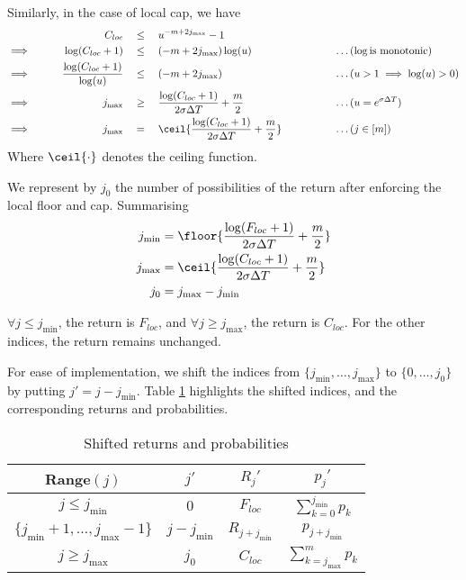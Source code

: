 Similarly, in the case of local cap, we have
\begin{alignat*}{9}
	                 &&  C_{loc}  \quad & \le \quad  u^{ -m + 2 j_{\max} } - 1 && \\
	\implies \qquad  &&  \log(C_{loc} + 1)  \quad & \le \quad  ( -m + 2 j_{\max} ) \log(u)  &&  \qquad \qquad \dots (\log \text{is monotonic}) \\
	\implies \qquad  &&  \frac{\log(C_{loc} + 1)}{\log(u)}  \quad & \le \quad  ( -m + 2 j_{\max} )  &&  \qquad \qquad \dots (u > 1 \implies \log(u) > 0) \\
	\implies \qquad  &&  j_{\max}  \quad & \ge \quad  \frac{ \log(C_{loc} + 1) }{ 2 \sigma \Delta T } + \frac{m}{2}  &&  \qquad \qquad \dots (u = e^{ \sigma \Delta T }) \\
	\implies \qquad  &&  j_{\max}  \quad & = \quad  \ceil{ \frac{ \log(C_{loc} + 1) }{ 2 \sigma \Delta T } + \frac{m}{2} }  &&  \qquad \qquad \dots (j \in [m]) \\
\end{alignat*}
Where $ \ceil{\cdot} $ denotes the ceiling function.

We represent by $ j_0 $ the number of possibilities of the return after enforcing the local floor and cap. Summarising
\begin{subequations}
	\label{eq:clq-j-mix-max}
	\begin{align}
		j_{\min} &= \floor{ \frac{ \log(F_{loc} + 1) }{ 2 \sigma \Delta T } + \frac{m}{2} }  \\
		j_{\max} &= \ceil { \frac{ \log(C_{loc} + 1) }{ 2 \sigma \Delta T } + \frac{m}{2} }  \\
		j_0 &= j_{\max} - j_{\min}
	\end{align}
\end{subequations}

$ \forall j \le j_{\min} $, the return is $ F_{loc} $, and $ \forall j \ge j_{\max} $, the return is $ C_{loc} $. For the other indices, the return remains unchanged.

For ease of implementation, we shift the indices from $ \{ j_{\min}, \dots, j_{\max} \} $ to $ \{ 0, \dots, j_0 \} $ by putting $ j' = j - j_{\min} $. Table \ref{tab:clq-shift} highlights the shifted indices, and the corresponding returns and probabilities.
\begin{table}[h]
	\label{tab:clq-shift}
	\centering
	\caption{Shifted returns and probabilities}
	\begin{tabular}{cccc}
		\toprule
		Range$(j)$  &  $ j' $  &  $ R_j' $  &  $ p_j' $  \\
		\midrule
		$ j \le j_{\min} $  &  $ 0 $  &  $ F_{loc} $  &  $ \sum_{k=0}^{j_{\min}} p_k $  \\
		$ \{ j_{\min} + 1, \dots, j_{\max} - 1 \} $  &  $ j - j_{\min} $ &  $ R_{j + j_{\min}} $  &  $ p_{j + j_{\min}} $  \\
		$ j \ge j_{\max} $  &  $ j_0 $  &  $ C_{loc} $  &  $ \sum_{k=j_{\max}}^{m} p_k $  \\
		\bottomrule
	\end{tabular}
\end{table}


